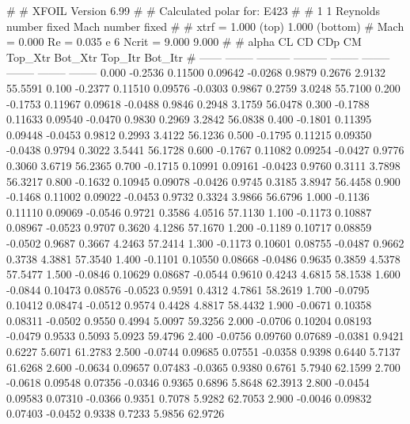 #  
#       XFOIL         Version 6.99
#  
# Calculated polar for: E423                                            
#  
# 1 1 Reynolds number fixed          Mach number fixed         
#  
# xtrf =   1.000 (top)        1.000 (bottom)  
# Mach =   0.000     Re =     0.035 e 6     Ncrit =   9.000  9.000
#  
#   alpha    CL        CD       CDp       CM     Top_Xtr  Bot_Xtr  Top_Itr  Bot_Itr
#  ------ -------- --------- --------- -------- -------- -------- -------- --------
   0.000  -0.2536   0.11500   0.09642  -0.0268   0.9879   0.2676   2.9132  55.5591
   0.100  -0.2377   0.11510   0.09576  -0.0303   0.9867   0.2759   3.0248  55.7100
   0.200  -0.1753   0.11967   0.09618  -0.0488   0.9846   0.2948   3.1759  56.0478
   0.300  -0.1788   0.11633   0.09540  -0.0470   0.9830   0.2969   3.2842  56.0838
   0.400  -0.1801   0.11395   0.09448  -0.0453   0.9812   0.2993   3.4122  56.1236
   0.500  -0.1795   0.11215   0.09350  -0.0438   0.9794   0.3022   3.5441  56.1728
   0.600  -0.1767   0.11082   0.09254  -0.0427   0.9776   0.3060   3.6719  56.2365
   0.700  -0.1715   0.10991   0.09161  -0.0423   0.9760   0.3111   3.7898  56.3217
   0.800  -0.1632   0.10945   0.09078  -0.0426   0.9745   0.3185   3.8947  56.4458
   0.900  -0.1468   0.11002   0.09022  -0.0453   0.9732   0.3324   3.9866  56.6796
   1.000  -0.1136   0.11110   0.09069  -0.0546   0.9721   0.3586   4.0516  57.1130
   1.100  -0.1173   0.10887   0.08967  -0.0523   0.9707   0.3620   4.1286  57.1670
   1.200  -0.1189   0.10717   0.08859  -0.0502   0.9687   0.3667   4.2463  57.2414
   1.300  -0.1173   0.10601   0.08755  -0.0487   0.9662   0.3738   4.3881  57.3540
   1.400  -0.1101   0.10550   0.08668  -0.0486   0.9635   0.3859   4.5378  57.5477
   1.500  -0.0846   0.10629   0.08687  -0.0544   0.9610   0.4243   4.6815  58.1538
   1.600  -0.0844   0.10473   0.08576  -0.0523   0.9591   0.4312   4.7861  58.2619
   1.700  -0.0795   0.10412   0.08474  -0.0512   0.9574   0.4428   4.8817  58.4432
   1.900  -0.0671   0.10358   0.08311  -0.0502   0.9550   0.4994   5.0097  59.3256
   2.000  -0.0706   0.10204   0.08193  -0.0479   0.9533   0.5093   5.0923  59.4796
   2.400  -0.0756   0.09760   0.07689  -0.0381   0.9421   0.6227   5.6071  61.2783
   2.500  -0.0744   0.09685   0.07551  -0.0358   0.9398   0.6440   5.7137  61.6268
   2.600  -0.0634   0.09657   0.07483  -0.0365   0.9380   0.6761   5.7940  62.1599
   2.700  -0.0618   0.09548   0.07356  -0.0346   0.9365   0.6896   5.8648  62.3913
   2.800  -0.0454   0.09583   0.07310  -0.0366   0.9351   0.7078   5.9282  62.7053
   2.900  -0.0046   0.09832   0.07403  -0.0452   0.9338   0.7233   5.9856  62.9726
